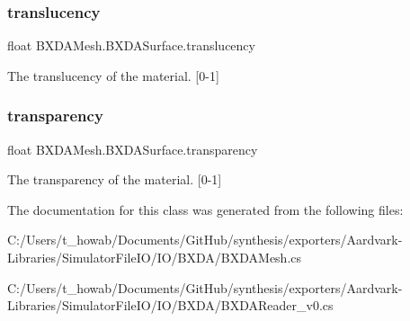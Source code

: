 \subsubsection{\texorpdfstring{translucency}{translucency}}
{\footnotesize\ttfamily float B\+X\+D\+A\+Mesh.\+B\+X\+D\+A\+Surface.\+translucency}



The translucency of the material. \mbox{[}0-\/1\mbox{]} 

\mbox{\label{class_b_x_d_a_mesh_1_1_b_x_d_a_surface_ae3e709bd450bd2ef01c5acba177a617b}} 
\subsubsection{\texorpdfstring{transparency}{transparency}}
{\footnotesize\ttfamily float B\+X\+D\+A\+Mesh.\+B\+X\+D\+A\+Surface.\+transparency}



The transparency of the material. \mbox{[}0-\/1\mbox{]} 



The documentation for this class was generated from the following files\+:\begin{DoxyCompactItemize}
\item 
C\+:/\+Users/t\+\_\+howab/\+Documents/\+Git\+Hub/synthesis/exporters/\+Aardvark-\/\+Libraries/\+Simulator\+File\+I\+O/\+I\+O/\+B\+X\+D\+A/B\+X\+D\+A\+Mesh.\+cs\item 
C\+:/\+Users/t\+\_\+howab/\+Documents/\+Git\+Hub/synthesis/exporters/\+Aardvark-\/\+Libraries/\+Simulator\+File\+I\+O/\+I\+O/\+B\+X\+D\+A/B\+X\+D\+A\+Reader\+\_\+v0.\+cs\end{DoxyCompactItemize}
